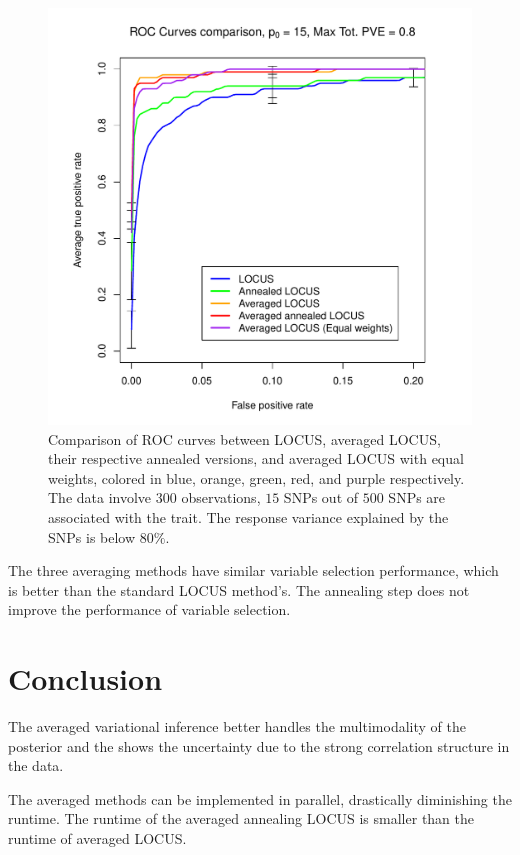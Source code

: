 \documentclass[portrait, a0, 30pt]{sciposter}
\begin{document}
\begin{multicols*}{2}
\begin{figure}[H]
\centering
\includegraphics[width=9in]{images/ROC_curves.pdf}
\caption{\label{fig:ROC}Comparison of ROC curves between LOCUS, averaged LOCUS, their respective annealed versions, and averaged LOCUS with equal weights, colored in blue, orange, green, red, and purple respectively. The data involve $300$ observations, $15$ SNPs out of $500$ SNPs are associated with the trait. The response variance explained by the SNPs is below $80\%$.}
\end{figure}

The three averaging methods have similar variable selection performance, which is better than the standard LOCUS method's. The annealing step does not improve the performance of variable selection.
\section{Conclusion}
The averaged variational inference better handles the multimodality of the posterior and the shows the uncertainty due to the strong correlation structure in the data.

The averaged methods can be implemented in parallel, drastically diminishing the runtime. The runtime of the averaged annealing LOCUS is smaller than the runtime of averaged LOCUS.


\end{multicols*}
\end{document}
